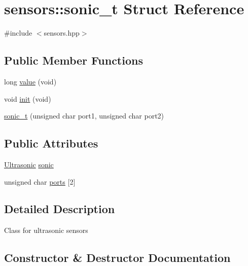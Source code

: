 \hypertarget{structsensors_1_1sonic__t}{}\section{sensors\+:\+:sonic\+\_\+t Struct Reference}
\label{structsensors_1_1sonic__t}


{\ttfamily \#include $<$sensors.\+hpp$>$}

\subsection*{Public Member Functions}
\begin{DoxyCompactItemize}
\item 
long \hyperlink{structsensors_1_1sonic__t_ac7f36354ed56c69a46efcccf9775c3d5}{value} (void)
\item 
void \hyperlink{structsensors_1_1sonic__t_a73cb49a56e55db64b42b5a6b604419dd}{init} (void)
\item 
\hyperlink{structsensors_1_1sonic__t_a29685163eb3f2fd6335fbadbcf98901e}{sonic\+\_\+t} (unsigned char port1, unsigned char port2)
\end{DoxyCompactItemize}
\subsection*{Public Attributes}
\begin{DoxyCompactItemize}
\item 
\hyperlink{API_8h_a527ee5b64142c3505d6931d8ed7ac6b7}{Ultrasonic} \hyperlink{structsensors_1_1sonic__t_ac84ca5638a8dc7156d90937eb228ed18}{sonic}
\item 
unsigned char \hyperlink{structsensors_1_1sonic__t_a64b68ab2ff696f95714dad492ea30939}{ports} \mbox{[}2\mbox{]}
\end{DoxyCompactItemize}


\subsection{Detailed Description}
Class for ultrasonic sensors 

\subsection{Constructor \& Destructor Documentation}
\mbox{\label{structsensors_1_1sonic__t_a29685163eb3f2fd6335fbadbcf98901e}} 
